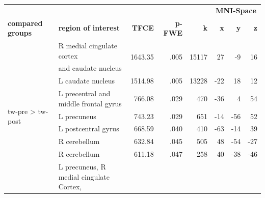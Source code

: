 \documentclass{article}
\begin{document}
    \begin{table}
        \centering

        \begin{tabular}{l|lrrrrrr}
            \multicolumn{1}{c}{} & & & & & \multicolumn{3}{c}{\textbf{MNI-Space}} \\ \cmidrule(lr){6-8}
            \textbf{compared groups}                      & \textbf{region of interest}             & \textbf{TFCE}            & \textbf{p-FWE}
            & \textbf{k}
            & \textbf{x}
            & \textbf{y}
            & \textbf{z}
            \\ \hline
            \multirow{9}{*}{\ac{tw}-pre > \ac{tw}-post}   & R medial cingulate cortex               & \multirow{2}{*}{1643.35}
            & \multirow{2}{*}{.005}
            & \multirow{2}{*}{15117}
            & \multirow{2}{*}{27}
            & \multirow{2}{*}{-9}
            & \multirow{2}{*}{16}
            \\
            & and caudate nucleus \\
            & L caudate nucleus                       & 1514.98                  & .005                   & 13228                   & -22                 & 18                   & 12                   \\
            & L precentral and middle frontal gyrus   & 766.08                   & .029                   & 470                     & -36                 & 4                    & 54                   \\
            & L precuneus                             & 743.23                   & .029                   & 651                     & -14                 & -56                  & 52                   \\
            & L postcentral gyrus                     & 668.59                   & .040                   & 410                     & -63                 & -14                  & 39                   \\
            & R cerebellum                            & 632.84                   & .045                   & 505                     & 48                  & -54                  & -27                  \\
            & R cerebellum                            & 611.18                   & .047                   & 258                     & 40                  & -38                  & -46                  \\ \hline
            \multirow{4}{*}{\ac{tw}-pre > \ac{cg}-women}  & L precuneus, R medial cingulate Cortex,

\end{tabular}
\end{table}
\end{document}
